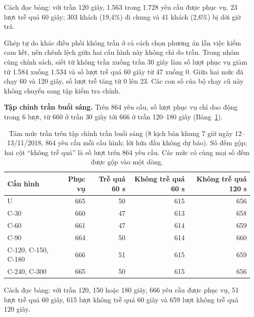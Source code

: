 Cách đọc bảng: với trần 120 giây, 1.563 trong 1.728 yêu cầu được phục vụ, 23 lượt trễ quá 60 giây; 303 khách (19,4\%)
đi chung và 41 khách (2,6\%) bị dời giờ trả.

Ghép tự do khác điều phối không trần ở cả cách chọn phương án lẫn việc kiểm cam kết, nên chênh lệch giữa hai cấu hình
này không chỉ do trần. Trong nhóm cùng chính sách, siết từ không trần xuống trần 30 giây làm số lượt phục vụ giảm từ
1.584 xuống 1.534 và số lượt trễ quá 60 giây từ 47 xuống 0. Giữa hai mức đã chạy 60 và 120 giây, số lượt trễ tăng từ 0
lên 23. Các con số của bộ chạy cũ này không chuyển sang tập kiểm tra chính.

\textbf{Tập chỉnh trần buổi sáng.} Trên 864 yêu cầu, số lượt phục vụ chỉ dao động trong 6 lượt, từ 660 ở trần 30 giây
tới 666 ở trần 120--180 giây (Bảng~\ref{bang:c4-sang}).

\begin{table}[htbp]
\centering
\caption[Các mức trần trên tập chỉnh trần buổi sáng]{Tám mức trần trên tập chỉnh trần buổi sáng (8 kịch bản khung 7 giờ ngày 12--13/11/2018, 864 yêu cầu
mỗi cấu hình; lời hứa đầu không dự báo). Số đếm gộp; hai cột ``không trễ quá'' là số lượt trên 864 yêu cầu. Các mức
có cùng mọi số đếm được gộp vào một dòng.}
\label{bang:c4-sang}
\small
\begin{tabular}{@{}lrrrr@{}}
\toprule
\textbf{Cấu hình} & \textbf{Phục vụ} & \textbf{Trễ quá 60 s} & \textbf{Không trễ quá 60 s} &
\textbf{Không trễ quá 120 s}\\
\midrule
U & 665 & 50 & 615 & 656\\
C-30 & 660 & 47 & 613 & 658\\
C-60 & 661 & 47 & 614 & 659\\
C-90 & 664 & 50 & 614 & 660\\
C-120, C-150, C-180 & 666 & 51 & 615 & 659\\
C-240, C-300 & 665 & 50 & 615 & 656\\
\bottomrule
\end{tabular}
\end{table}

Cách đọc bảng: với trần 120, 150 hoặc 180 giây, 666 yêu cầu được phục vụ, 51 lượt trễ quá 60 giây, 615 lượt không trễ
quá 60 giây và 659 lượt không trễ quá 120 giây.

